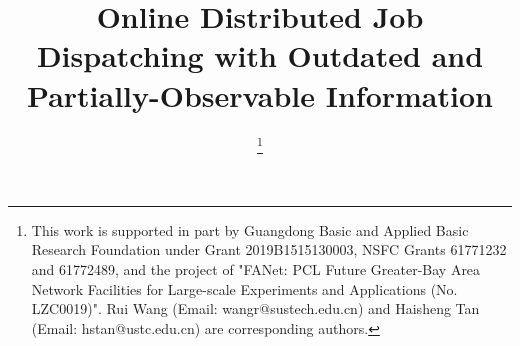 \documentclass[10pt,conference]{IEEEtran} %
\theoremstyle{definition}             %
\theoremstyle{remark}                 %
\theoremstyle{plain}                  %
\begin{document}
    \title{
        Online Distributed Job Dispatching with Outdated and Partially-Observable Information
    }

    \author{
        \thanks{ 
            This work is supported in part by Guangdong Basic and Applied Basic Research Foundation under Grant  2019B1515130003, NSFC Grants 61771232 and 61772489, and the project of "FANet: PCL Future Greater-Bay Area Network Facilities for Large-scale Experiments and Applications (No. LZC0019)". Rui Wang (Email: wangr@sustech.edu.cn) and Haisheng Tan (Email: hstan@ustc.edu.cn) are corresponding authors.
        }
    }%

\end{document}
